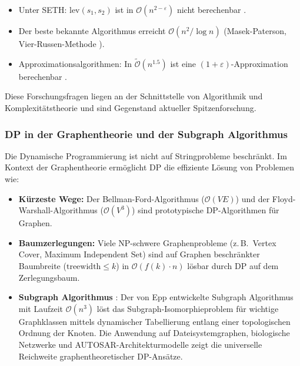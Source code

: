 ﻿\documentclass[a4paper,12pt]{article}
\theoremstyle{definition}
\begin{document}
\begin{itemize}
    \item Unter SETH: $\mathrm{lev}(s_1, s_2)$ ist in $\mathcal{O}(n^{2-\varepsilon})$
          nicht berechenbar \cite{backurs2015}.
    \item Der beste bekannte Algorithmus erreicht $\mathcal{O}(n^2 / \log n)$
          (Masek-Paterson, Vier-Russen-Methode \cite{masek1980}).
    \item Approximationsalgorithmen: In $\tilde{\mathcal{O}}(n^{1.5})$ ist eine
          $(1+\varepsilon)$-Approximation berechenbar \cite{bar2004}.
\end{itemize}

Diese Forschungsfragen liegen an der Schnittstelle von Algorithmik und
Komplexitätstheorie und sind Gegenstand aktueller Spitzenforschung.

\subsubsection{DP in der Graphentheorie und der Subgraph Algorithmus}

Die Dynamische Programmierung ist nicht auf Stringprobleme beschränkt. Im Kontext
der Graphentheorie ermöglicht DP die effiziente Lösung von Problemen wie:
\begin{itemize}
    \item \textbf{Kürzeste Wege:} Der Bellman-Ford-Algorithmus \cite{bellman1958}
          ($\mathcal{O}(VE)$) und der Floyd-Warshall-Algorithmus \cite{floyd1962}
          ($\mathcal{O}(V^3)$) sind prototypische DP-Algorithmen für Graphen.
    \item \textbf{Baumzerlegungen:} Viele NP-schwere Graphenprobleme
          (z.\,B.\ Vertex Cover, Maximum Independent Set) sind auf Graphen
          beschränkter Baumbreite ($\mathrm{treewidth} \leq k$) in
          $\mathcal{O}(f(k) \cdot n)$ lösbar durch DP auf dem Zerlegungsbaum.
    \item \textbf{Subgraph Algorithmus} \cite{epp2026subgraph}: Der von Epp
          entwickelte Subgraph Algorithmus mit Laufzeit $\mathcal{O}(n^3)$
          löst das Subgraph-Isomorphieproblem für wichtige Graphklassen
          mittels dynamischer Tabellierung entlang einer topologischen Ordnung
          der Knoten. Die Anwendung auf Dateisystemgraphen, biologische Netzwerke
          und AUTOSAR-Architekturmodelle zeigt die universelle Reichweite
          graphentheoretischer DP-Ansätze.
\end{itemize}
\end{document}
